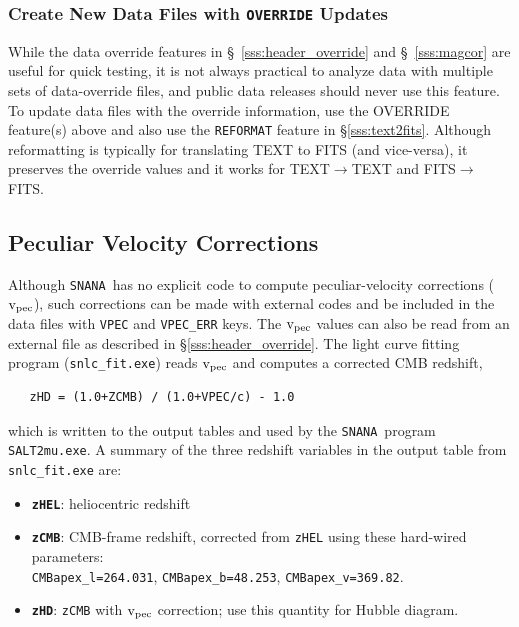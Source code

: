\documentclass[12pt]{article}
\newcommand{\snana}{{\tt SNANA}}
\newcommand{\vpec}{{\rm v}_{\rm pec}}
\begin{document}

\subsubsection{Create New Data Files with {\tt OVERRIDE} Updates}
\label{sss:new_data_files}

While the data override features in 
\S~\ref{sss:header_override} and \S~\ref{sss:magcor}
are useful for quick testing, it is not always practical to 
analyze data with multiple sets of data-override files,
and public data releases should never use this feature.
To update data files with the override information,
use the OVERRIDE feature(s) above and also
use the {\tt REFORMAT} feature in \S\ref{sss:text2fits}.
Although reformatting is typically for translating TEXT to FITS
(and vice-versa), it preserves the override values and
it works for TEXT$\to$TEXT and FITS$\to$FITS. 

\subsection{Peculiar Velocity Corrections }
\label{subsec:vpec}

Although \snana\ has no explicit code to compute
peculiar-velocity corrections ($\vpec$), such corrections
can be made with external codes and be included in the data files
with {\tt VPEC} and {\tt VPEC\_ERR} keys. The $\vpec$ values
can also be read from an external file as described in 
\S\ref{sss:header_override}. The light curve fitting program
({\tt snlc\_fit.exe}) reads $\vpec$ and computes a corrected
CMB redshift,
\begin{verbatim}
   zHD = (1.0+ZCMB) / (1.0+VPEC/c) - 1.0 
\end{verbatim}
which is written to the output tables and used by the \snana\ program
{\tt SALT2mu.exe}.
A summary of the three redshift variables in the output table
from {\tt snlc\_fit.exe}  are:
\begin{itemize}
   \itemsep0em 
   \item {\bf {\tt zHEL}}: heliocentric redshift
   \item {\bf {\tt zCMB}}: CMB-frame redshift, corrected from {\tt zHEL} using
       these hard-wired parameters: \\ {\tt CMBapex\_l=264.031}, {\tt CMBapex\_b=48.253}, {\tt CMBapex\_v=369.82}.
   \item {\bf {\tt zHD}}: {\tt zCMB} with $\vpec$ correction; use this quantity for Hubble diagram.
\end{itemize}
\end{document}
